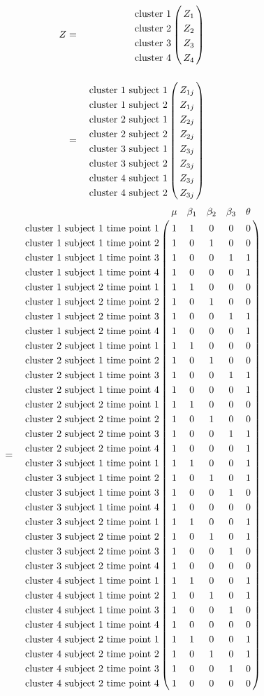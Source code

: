 \documentclass{article}
\begin{document}
\begin{eqnarray*}
Z&=&\bordermatrix{
  					& \cr
\textrm{cluster 1} 	& Z_{1}\cr
\textrm{cluster 2}	&Z_{2} 		\cr
\textrm{cluster 3}  &Z_{3} 		\cr
\textrm{cluster 4}  &Z_{4}   	\cr
}\\
&=&\bordermatrix{
  					& \cr
\textrm{cluster 1 subject 1} 	& Z_{1j}\cr
\textrm{cluster 1 subject 2}	&Z_{1j} 		\cr
\textrm{cluster 2 subject 1} 	& Z_{2j}\cr
\textrm{cluster 2 subject 2}	&Z_{2j} 		\cr
\textrm{cluster 3 subject 1}   & Z_{3j}\cr
\textrm{cluster 3 subject 2}	&Z_{3j} 		\cr
\textrm{cluster 4 subject 1}   & Z_{3j}\cr
\textrm{cluster 4 subject 2}  &Z_{3j} 		\cr
}
\end{eqnarray*}
\begin{eqnarray*}
&=&  \bordermatrix{
  						& \mu	&\beta_{1}	& \beta_{2}	& \beta_{3}&\theta\cr
\textrm{cluster 1 subject 1 time point 1} 	& 1		&1			&0		 	& 0 & 0\cr
\textrm{cluster 1 subject 1 time point 2} 	&1 		&0 			&1			& 0 & 0\cr
\textrm{cluster 1 subject 1 time point 3}	&1 		&0			&0			& 1& 1\cr
\textrm{cluster 1 subject 1 time point 4}  &1 		&0			&0		&0	& 1\cr
\textrm{cluster 1 subject 2 time point 1} 	& 1		&1			&0		&0 	& 0\cr
\textrm{cluster 1 subject 2 time point 2} 	&1 		&0 			&1		&0	& 0\cr
\textrm{cluster 1 subject 2 time point 3}	&1 		&0			&0			& 1& 1\cr
\textrm{cluster 1 subject 2 time point 4}  &1 		&0			&0		&0	& 1\cr
\textrm{cluster 2 subject 1 time point 1} 	& 1		&1			&0		 	& 0& 0\cr
\textrm{cluster 2 subject 1 time point 2} 	&1 		&0 			&1			& 0& 0\cr
\textrm{cluster 2 subject 1 time point 3}	&1 		&0			&0		& 1	& 1\cr
\textrm{cluster 2 subject 1 time point 4}  &1 		&0			&0		& 0	& 1\cr
\textrm{cluster 2 subject 2 time point 1} 	& 1		&1			&0		 	& 0& 0\cr
\textrm{cluster 2 subject 2 time point 2} 	&1 		&0 			&1			& 0& 0\cr
\textrm{cluster 2 subject 2 time point 3}	&1 		&0			&0			& 1& 1\cr
\textrm{cluster 2 subject 2 time point 4}  &1 		&0			&0		& 0	& 1\cr
\textrm{cluster 3 subject 1 time point 1}   & 1		&1			&0		 	& 0& 1\cr
\textrm{cluster 3 subject 1 time point 2} 	&1 		&0 			&1			& 0& 1\cr
\textrm{cluster 3 subject 1 time point 3}	&1 		&0			&0		& 1	& 0\cr
\textrm{cluster 3 subject 1 time point 4}  &1 		&0			&0		& 0	& 0\cr
\textrm{cluster 3 subject 2 time point 1} 	& 1		&1			&0		 	& 0& 1\cr
\textrm{cluster 3 subject 2 time point 2} 	&1 		&0 			&1			& 0& 1\cr
\textrm{cluster 3 subject 2 time point 3}	&1 		&0			&0			& 1& 0\cr
\textrm{cluster 3 subject 2 time point 4}  &1 		&0			&0		& 0	& 0\cr
\textrm{cluster 4 subject 1 time point 1}   & 1  	&1			&0		 	& 0& 1\cr
\textrm{cluster 4 subject 1 time point 2} 	&1 		&0 			&1			& 0& 1\cr
\textrm{cluster 4 subject 1 time point 3}	&1 		&0			&0		& 1	& 0\cr
\textrm{cluster 4 subject 1 time point 4}  &1 		&0			&0		& 0	& 0\cr
\textrm{cluster 4 subject 2 time point 1} 	& 1		&1			&0		 	& 0& 1\cr
\textrm{cluster 4 subject 2 time point 2} 	&1 		&0 			&1			& 0& 1\cr
\textrm{cluster 4 subject 2 time point 3}	&1 		&0			&0			& 1& 0\cr
\textrm{cluster 4 subject 2 time point 4}  &1 		&0			&0		& 0	& 0\cr
}
\end{eqnarray*}
\end{document}
